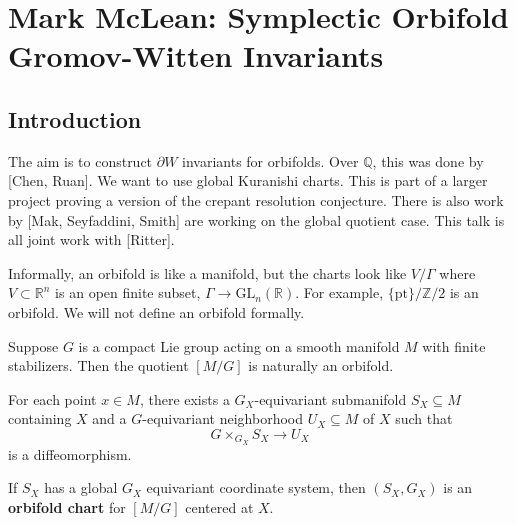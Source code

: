 \chapter{Mark McLean: Symplectic Orbifold Gromov-Witten Invariants}
\label{mclean}


\section{Introduction}

The aim is to construct $\partial W$ invariants for orbifolds. Over $\mathbb{Q}$, this was done by [Chen, Ruan]. We want to use global Kuranishi charts. This is part of a larger project proving a version of the crepant resolution conjecture. There is also work by [Mak, Seyfaddini, Smith] are working on the global quotient case. This talk is all joint work with [Ritter].

Informally, an orbifold is like a manifold, but the charts look like $V/\Gamma$ where $V\subset \mathbb{R}^n$ is an open finite subset, $\Gamma \to \text{GL}_n(\mathbb{R})$. For example, $\{\text{pt}\}/\mathbb{Z}/2$ is an orbifold. We will not define an orbifold formally.

Suppose $G$ is a compact Lie group acting on a smooth manifold $M$ with finite stabilizers. Then the quotient $[M/G]$ is naturally an orbifold.

\begin{theorem}

For each point $x\in M$, there exists a $G_X$-equivariant submanifold $S_X \subseteq M$ containing $X$ and a $G$-equivariant neighborhood $U_X\subseteq M$ of $X$ such that
\[
G\times_{G_X} S_X\to U_X
\]
is a diffeomorphism.

\end{theorem}

\begin{definition}

If $S_X$ has a global $G_X$ equivariant coordinate system, then $(S_X, G_X)$ is an \textbf{orbifold chart} for $[M/G]$ centered at $X$.

\end{definition}

